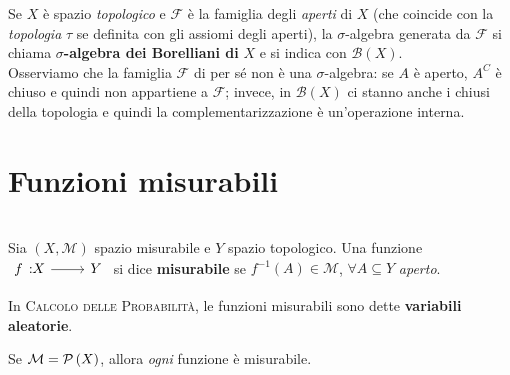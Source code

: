 \begin{example}
	Se $X$ è spazio \textit{topologico} e $\mathcal{F}$ è la famiglia degli \textit{aperti} di $X$ (che coincide con la \textit{topologia} $\tau$ se definita con gli assiomi degli aperti), la $\sigma$-algebra generata da $\mathcal{F}$ si chiama $\sigma$\textbf{-algebra dei Borelliani di} $X$ e si indica con $\mathcal{B}\left(X\right)$.\\
	Osserviamo che la famiglia $\mathcal{F}$ di per sé non è una $\sigma$-algebra: se $A$ è aperto, $A^C$ è chiuso e quindi non appartiene a $\mathcal{F}$; invece, in $\mathcal{B}\left(X\right)$ ci stanno anche i chiusi della topologia e quindi la complementarizzazione è un'operazione interna.
\end{example}
\section{Funzioni misurabili}
\begin{define}~{}\\
	Sia $\left(X, \mathcal{M}\right)$ spazio misurabile e $Y$ spazio topologico. Una funzione $\funz{f}{X}{Y}$ si dice \textbf{misurabile} se $f^{-1}\left(A\right)\in\mathcal{M}$, $\forall A\subseteq Y$ \textit{aperto}.
\end{define}
\begin{digression}
	In \textsc{Calcolo delle Probabilità}, le funzioni misurabili sono dette \textbf{variabili aleatorie}.
\end{digression}
\begin{observe}
	Se $\mathcal{M}=\mathcal{P}\left(X\right)$, allora \textit{ogni} funzione è misurabile.
\end{observe}

